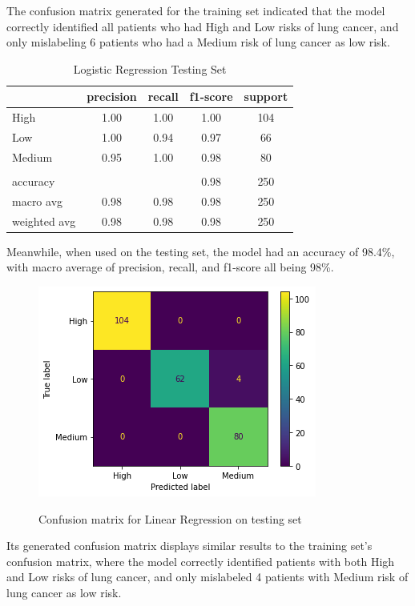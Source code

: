 \documentclass[runningheads]{llncs}
\begin{document}
The confusion matrix generated for the training set indicated that the model correctly identified all patients who had High and Low risks of lung cancer, and only mislabeling 6 patients who had a Medium risk of lung cancer as low risk.
\newpage

\begin{table}[ht]
\centering
\caption{Logistic Regression Testing Set}
\begin{tabular}{|l|c|c|c|c|} \hline
 & precision & recall & f1-score & support \\ \hline
High   & 1.00 & 1.00 & 1.00 & 104 \\ \hline
Low    & 1.00 & 0.94 & 0.97 & 66 \\ \hline
Medium & 0.95 & 1.00 & 0.98 & 80 \\ \hline
& & & & \\ \hline
accuracy     & & & 0.98 & 250 \\ \hline
macro avg    & 0.98 & 0.98 & 0.98 & 250 \\ \hline
weighted avg & 0.98 & 0.98 & 0.98 & 250 \\ \hline
\end{tabular}
\label{tab:regression-testing}
\end{table}

Meanwhile, when used on the testing set, the model had an accuracy of 98.4\%, with macro average of precision, recall, and f1-score all being 98\%. 

\begin{figure}[ht]           	 
\centering               	 
\caption{Confusion matrix for Linear Regression on testing set}
\includegraphics[scale=0.5]{regression-CM-testing.png}  	 
\label{fig:regression-CM-testing}
\end{figure}

Its generated confusion matrix displays similar results to the training set’s confusion matrix, where the model correctly identified patients with both High and Low risks of lung cancer, and only mislabeled 4 patients with Medium risk of lung cancer as low risk.
\end{document}
